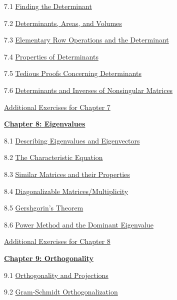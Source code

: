 \documentclass{ximera}
\begin{document}
7.1	\href{https://ximera.osu.edu/oerlinalg/LinearAlgebra/DET-0010/main}{Finding the Determinant}
	
7.2	\href{https://ximera.osu.edu/oerlinalg/LinearAlgebra/DET-0070/main}{Determinants, Areas, and Volumes}
	
7.3	\href{https://ximera.osu.edu/oerlinalg/LinearAlgebra/DET-0030/main}{Elementary Row Operations and the Determinant}
	
7.4	\href{https://ximera.osu.edu/oerlinalg/LinearAlgebra/DET-0040/main}{Properties of Determinants}
	
7.5	\href{https://ximera.osu.edu/oerlinalg/LinearAlgebra/DET-0050/main}{Tedious Proofs Concerning Determinants}
	
7.6	\href{https://ximera.osu.edu/oerlinalg/LinearAlgebra/DET-0060/main}{Determinants and Inverses of Nonsingular Matrices}
	
\href{https://ximera.osu.edu/oerlinalg/LinearAlgebra/SUPX-0070/main}{Additional Exercises for Chapter 7}
	
\href{https://ximera.osu.edu/oerlinalg/LinearAlgebra/XLAChapter_eigenvalues/main}{\textbf{Chapter 8: Eigenvalues}}
	
8.1	\href{https://ximera.osu.edu/oerlinalg/LinearAlgebra/EIG-0010/main}{Describing Eigenvalues and Eigenvectors}
	
8.2	\href{https://ximera.osu.edu/oerlinalg/LinearAlgebra/EIG-0020/main}{The Characteristic Equation}
	
8.3	\href{https://ximera.osu.edu/oerlinalg/LinearAlgebra/EIG-0040/main}{Similar Matrices and their Properties}
	
8.4	\href{https://ximera.osu.edu/oerlinalg/LinearAlgebra/EIG-0050/main}{Diagonalizable Matrices/Multiplicity}
	
8.5	\href{https://ximera.osu.edu/oerlinalg/LinearAlgebra/EIG-0080/main}{Gershgorin's Theorem}
	
8.6	\href{https://ximera.osu.edu/oerlinalg/LinearAlgebra/EIG-0070/main}{Power Method and the Dominant Eigenvalue}
	
\href{https://ximera.osu.edu/oerlinalg/LinearAlgebra/SUPX-0080/main}{Additional Exercises for Chapter 8}
	
\href{https://ximera.osu.edu/oerlinalg/LinearAlgebra/XLAChapter_orthogonality/main}{\textbf{Chapter 9: Orthogonality}}
	
9.1	\href{https://ximera.osu.edu/oerlinalg/LinearAlgebra/RTH-0010/main}{Orthogonality and Projections}
	
9.2	\href{https://ximera.osu.edu/oerlinalg/LinearAlgebra/RTH-0015/main}{Gram-Schmidt Orthogonalization}
	
\end{document}
